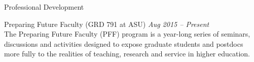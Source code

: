 \begin{rBulletSection}{Professional Development}

    \item Preparing Future Faculty (GRD 791 at ASU) \hfill \emph{Aug 2015 -- Present}\\
    The Preparing Future Faculty (PFF) program is a year-long series of seminars, discussions and activities designed to expose graduate students and postdocs more fully to the realities of teaching, research and service in higher education.


\end{rBulletSection}
